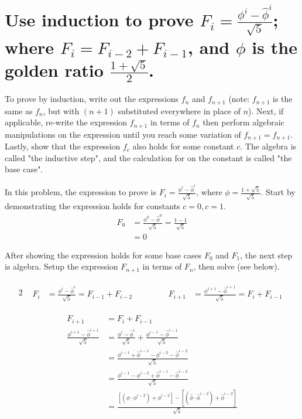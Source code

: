 \section[Problem 2]{Use induction to prove $F_i = \frac{\phi^i - \hat{\phi}^i}{\sqrt{5}}$; where $F_i = F_{i-2} + F_{i-1}$, and $\phi$ is the golden ratio $\frac{1 + \sqrt{5}}{2}$.}

To prove by induction, write out the expressions $f_n$ and $f_{n + 1}$ (note: $f_{n + 1}$ is the same as $f_n$, but with $(n + 1)$ substituted everywhere in place of $n$). Next, if applicable, re-write the expression $f_{n + 1}$ in terms of $f_n$ then perform algebraic manipulations on the expression until you reach some variation of $f_{n + 1} = f_{n + 1}$.  Lastly, show that the expression $f_c$ also holds for some constant $c$. The algebra is called "the inductive step", and the calculation for on the constant is called "the base case".

In this problem, the expression to prove is $F_i = \frac{\phi^i - \hat{\phi}^i}{\sqrt{5}}$, where $\phi = \frac{1 + \sqrt{5}}{\sqrt{5}}$. Start by demonstrating the expression holds for constants $c = 0, c = 1$. 
\begin{align}
	F_0 &= \frac{\phi^0 - \hat{\phi}^0}{\sqrt{5}} = \frac{1 - 1}{\sqrt{5}} \\
		&= 0 
\end{align}

After showing the expression holds for some base cases $F_0$ and $F_1$, the next step is algebra. Setup the expression $F_{n + 1}$ in terms of $F_n$, then solve (see below).

\setcounter{equation}{0}
\begin{alignat*}{2}
	&
	\begin{aligned}
		F_i &= \frac{\phi^i - \hat{\phi}^i}{\sqrt{5}} = F_{i - 1} + F_{i - 2}
	\end{aligned}
	& \qquad &
	\begin{aligned}
		F_{i + 1} &= \frac{\phi^{i + 1} - \hat{\phi}^{i + 1}}{\sqrt{5}} = F_{i} + F_{i - 1}
	\end{aligned}
\end{alignat*}

\begin{align}
	F_{i + 1} &= F_{i} + F_{i - 1} \\
	\frac{\phi^{i + 1} - \hat{\phi}^{i + 1}}{\sqrt{5}} 
	&=  
	\frac{\phi^{i} - \hat{\phi}^{i}}{\sqrt{5}} +
	\frac{\phi^{i - 1} - \hat{\phi}^{i - 1}}{\sqrt{5}} \\
	&=
	\frac{\phi^{i - 1} + \hat{\phi}^{i - 1} - \phi^{i - 2} - \hat{\phi}^{i - 2}}{\sqrt{5}} \\
	&=
	\frac{\phi^{i - 1} - \phi^{i - 2} + \hat{\phi}^{i - 1} - \hat{\phi}^{i - 2}}{\sqrt{5}} \\
	&=
	\frac{[(\phi \cdot \phi^{i -2}) + \phi^{i - 2}] - [(\hat{\phi} \cdot \hat{\phi}^{i - 2}) + \hat{\phi}^{i - 2}]}{\sqrt{5}} \\
\end{align}

